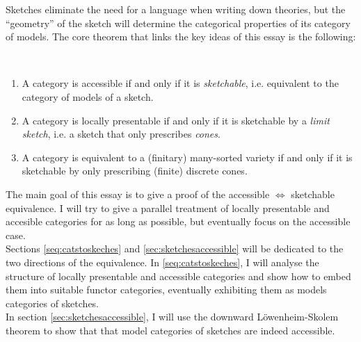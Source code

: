Sketches eliminate the need for a language when writing down theories, but the ``geometry'' of the sketch will determine the categorical properties of its category of models. The core theorem that links the key ideas of this essay is the following:

\begin{Theorem}[Sketchability]\
\begin{enumerate}
\item A category is accessible if and only if it is \emph{sketchable}, i.e. equivalent to the category of models of a sketch. 

\item A category is locally presentable if and only if it is sketchable by a \emph{limit sketch}, i.e. a sketch that only prescribes \emph{cones}.

\item A category is equivalent to a (finitary) many-sorted variety if and only if it is sketchable by only prescribing (finite) discrete cones.
\end{enumerate}
\end{Theorem}

The main goal of this essay is to give a proof of the accessible $\Leftrightarrow$ sketchable equivalence. I will try to give a parallel treatment of locally presentable and accesible categories for as long as possible, but eventually focus on the accessible case. \\

Sections \ref{seq:catstoskeches} and \ref{sec:sketchesaccessible} will be dedicated to the two directions of the equivalence. In \ref{seq:catstoskeches}, I will analyse the structure of locally presentable and accessible categories and show how to embed them into suitable functor categories, eventually exhibiting them as models categories of sketches. \\

In section \ref{sec:sketchesaccessible}, I will use the downward Löwenheim-Skolem theorem to show that that model categories of sketches are indeed accessible.